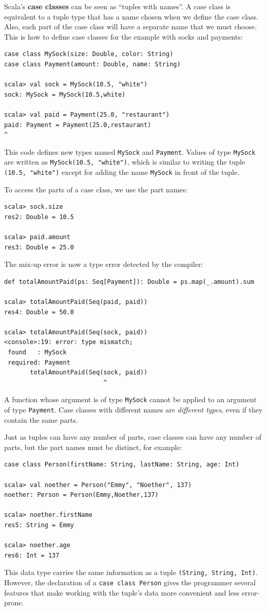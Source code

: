 Scala's \textbf{case classes} can be seen as ``tuples
with names''. A case class is equivalent to a tuple type that has
a name chosen when we define the case class. Also, each part of the
case class will have a separate name that we must choose. This is
how to define case classes for the example with socks and payments:
\begin{lstlisting}
case class MySock(size: Double, color: String)
case class Payment(amount: Double, name: String)

scala> val sock = MySock(10.5, "white")
sock: MySock = MySock(10.5,white)

scala> val paid = Payment(25.0, "restaurant")
paid: Payment = Payment(25.0,restaurant)                                  ^ 
\end{lstlisting}
This code defines new types named \lstinline!MySock! and \lstinline!Payment!.
Values of type \lstinline!MySock! are written as \lstinline!MySock(10.5, "white")!,
which is similar to writing the tuple \lstinline!(10.5, "white")!
except for adding the name \lstinline!MySock! in front of the tuple.

To access the parts of a case class, we use the part names:
\begin{lstlisting}
scala> sock.size
res2: Double = 10.5

scala> paid.amount
res3: Double = 25.0
\end{lstlisting}
The mix-up error is now a type error detected by
the compiler:
\begin{lstlisting}
def totalAmountPaid(ps: Seq[Payment]): Double = ps.map(_.amount).sum

scala> totalAmountPaid(Seq(paid, paid))
res4: Double = 50.0

scala> totalAmountPaid(Seq(sock, paid))
<console>:19: error: type mismatch;
 found   : MySock
 required: Payment
       totalAmountPaid(Seq(sock, paid))
                           ^
\end{lstlisting}
A function whose argument is of type \lstinline!MySock! cannot be
applied to an argument of type \lstinline!Payment!. Case classes
with different names are \emph{different types}, even if they contain
the same parts. 

Just as tuples can have any number of parts, case classes can have
any number of parts, but the part names must be distinct, for example:
\begin{lstlisting}
case class Person(firstName: String, lastName: String, age: Int)

scala> val noether = Person("Emmy", "Noether", 137)
noether: Person = Person(Emmy,Noether,137)

scala> noether.firstName
res5: String = Emmy

scala> noether.age
res6: Int = 137
\end{lstlisting}
This data type carries the same information as a tuple \lstinline!(String, String, Int)!.
However, the declaration of a \lstinline!case class Person! gives
the programmer several features that make working with the tuple's
data more convenient and less error-prone.

